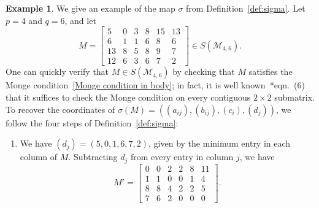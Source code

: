 \documentclass[noamsfonts,10pt]{amsart}
\newcommand{\M}{\mathcal{M}}
\newcommand{\1}{\mathbf{1}}
\theoremstyle{plain}
\theoremstyle{definition}
\newtheorem{example}[theorem]{Example}
\numberwithin{equation}{section}
\begin{document}
\begin{example}
    \label{ex:sigma}
    We give an example of the map $\sigma$ from Definition~\ref{def:sigma}.
    Let $p = 4$ and $q = 6$, and let
    \[
        M = 
        \begin{bmatrix}
            5 & 0 & 3 & 8 & 15 & 13 \\
            6 & 1 & 1 & 6 & 8 & 6 \\
            13 & 8 & 5 & 8 & 9 & 7 \\
            12 & 6 & 3 & 6 & 7 & 2
        \end{bmatrix}
        \in S(\M_{4,6}).
    \]
    One can quickly verify that $M \in S(\M_{4,6})$ by checking that $M$ satisfies the Monge condition~\eqref{Monge condition in body};
    in fact, it is well known~\cite{Burkard}*{eqn.~(6)} that it suffices to check the Monge condition on every contiguous $2 \times 2$ submatrix.
    To recover the coordinates of $\sigma(M) = ((a_{ij}), (b_{ij}), (c_i), (d_j))$, we follow the four steps of Definition~\ref{def:sigma}:
    \begin{enumerate}
        \item We have $(d_j) = (5,0,1,6,7,2)$, given by the minimum entry in each column of $M$.
        Subtracting $d_j$ from every entry in column $j$, we have
        \[
            M' = \begin{bmatrix}
                0 & 0 & 2 & 2 & 8 & 11 \\
                1 & 1 & 0 & 0 & 1 & 4 \\
                8 & 8 & 4 & 2 & 2 & 5 \\
                7 & 6 & 2 & 0 & 0 & 0
            \end{bmatrix}.
        \]


\end{enumerate}
\end{example}
\end{document}

